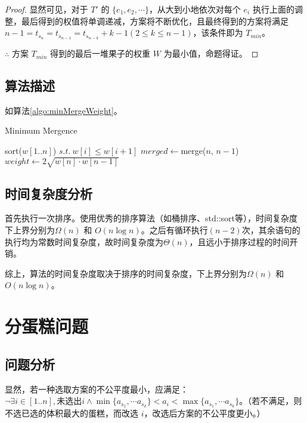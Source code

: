 \documentclass[11pt]{article}
\begin{document}
\begin{proof}
        显然可见，对于 $T'$ 的 $\{e_1, e_2, \cdots\}$，从大到小地依次对每个 $e_i$ 执行上面的调整，最后得到的权值将单调递减，方案将不断优化，且最终得到的方案将满足 $n-1 = t_{s_n} = t_{s_{n-1}} = t_{s_{n-k}} + k-1(2\leq k \leq n-1)$，该条件即为 $T_{min}$。 

        $\therefore$ 方案 $T_{min}$ 得到的最后一堆果子的权重 $W$ 为最小值，命题得证。
    \end{proof}

\subsection*{算法描述}
    如算法\ref{algo:minMergeWeight}。
    \begin{algorithm}
        \caption{Minimum Mergence}\label{algo:minMergeWeight}
        sort($w[1..n]$) $s.t.\ w[i]\leq w[i+1]$\;
        $merged \leftarrow$merge($n$, $n-1$)\;
        $weight \leftarrow 2\sqrt{w[n]\cdot w[n-1]}$\;
        
    \end{algorithm}

\subsection*{时间复杂度分析}
    首先执行一次排序。使用优秀的排序算法（如桶排序、std::sort等），时间复杂度下上界分别为$\Omega(n)$ 和 $O(n\log n)$。之后有循环执行$(n-2)$次，其余语句的执行均为常数时间复杂度，故时间复杂度为$\Theta(n)$，且远小于排序过程的时间开销。

    综上，算法的时间复杂度取决于排序的时间复杂度，下上界分别为$\Omega(n)$ 和 $O(n\log n)$。


\section{分蛋糕问题}
\subsection*{问题分析}
    显然，若一种选取方案的不公平度最小，应满足：$\lnot \exists i \in[1..n], \text{未选出}i \land \min \{a_{s_1}, \cdots a_{s_k}\} < a_i < \max \{a_{s_1}, \cdots a_{s_k}\}$。（若不满足，则不选已选的体积最大的蛋糕，而改选 $i$，改选后方案的不公平度更小。）
\end{document}
